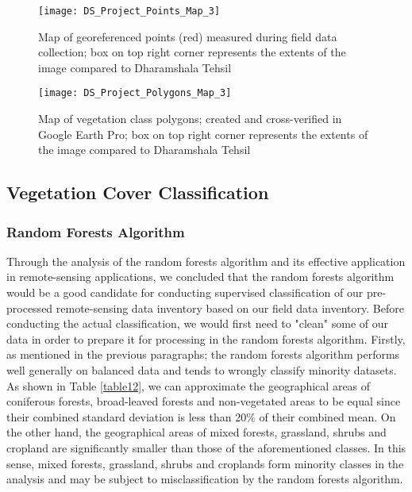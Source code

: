 \begin{figure}[H]
	\centering
	\texttt{[image: DS\_Project\_Points\_Map\_3]}
	\caption{Map of georeferenced points (red) measured during field data collection; box on top right corner represents the extents of the image compared to Dharamshala Tehsil}\label{fig13}
\end{figure}

\vspace{-10pt}

\begin{figure}[H]
	\centering
	\texttt{[image: DS\_Project\_Polygons\_Map\_3]}
	\caption{Map of vegetation class polygons; created and cross-verified in Google Earth Pro; box on top right corner represents the extents of the image compared to Dharamshala Tehsil}\label{fig14}
\end{figure}

\clearpage

\subsection{Vegetation Cover Classification}

\subsubsection{Random Forests Algorithm}

\justify
Through the analysis of the random forests algorithm and its effective application in remote-sensing applications, we concluded that the random forests algorithm would be a good candidate for conducting supervised classification of our pre-processed remote-sensing data inventory based on our field data inventory. Before conducting the actual classification, we would first need to "clean" some of our data in order to prepare it for processing in the random forests algorithm. Firstly, as mentioned in the previous paragraphs; the random forests algorithm performs well generally on balanced data and tends to wrongly classify minority datasets. As shown in Table \ref{table12}, we can approximate the geographical areas of coniferous forests, broad-leaved forests and non-vegetated areas to be equal since their combined standard deviation is less than 20$\%$ of their combined mean. On the other hand, the geographical areas of mixed forests, grassland, shrubs and cropland are significantly smaller than those of the aforementioned classes. In this sense, mixed forests, grassland, shrubs and croplands form minority classes in the analysis and may be subject to misclassification by the random forests algorithm.


